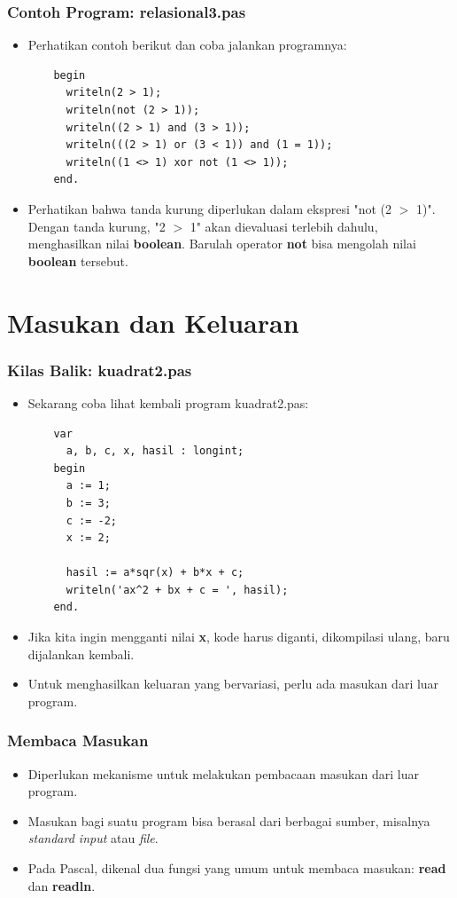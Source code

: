 \begin{frame}[fragile]
\frametitle{Contoh Program: relasional3.pas}
\begin{itemize}
  \item Perhatikan contoh berikut dan coba jalankan programnya:
  \begin{lstlisting}
    begin
      writeln(2 > 1);
      writeln(not (2 > 1));
      writeln((2 > 1) and (3 > 1));
      writeln(((2 > 1) or (3 < 1)) and (1 = 1));
      writeln((1 <> 1) xor not (1 <> 1));
    end.
  \end{lstlisting}
  \item Perhatikan bahwa tanda kurung diperlukan dalam ekspresi "not (2 $>$ 1)". Dengan tanda kurung, "2 $>$ 1" akan dievaluasi terlebih dahulu, menghasilkan nilai \textbf{boolean}. Barulah operator \textbf{not} bisa mengolah nilai \textbf{boolean} tersebut.
\end{itemize}
\end{frame}

\section{Masukan dan Keluaran}
\frame{\sectionpage}

\begin{frame}[fragile]
\frametitle{Kilas Balik: kuadrat2.pas}
\begin{itemize}
  \item Sekarang coba lihat kembali program kuadrat2.pas:
  \begin{lstlisting}
    var
      a, b, c, x, hasil : longint;
    begin
      a := 1;
      b := 3;
      c := -2;
      x := 2;

      hasil := a*sqr(x) + b*x + c;
      writeln('ax^2 + bx + c = ', hasil);
    end.
  \end{lstlisting}
  \item Jika kita ingin mengganti nilai \textbf{x}, kode harus diganti, dikompilasi ulang, baru dijalankan kembali.
  \item Untuk menghasilkan keluaran yang bervariasi, perlu ada \newline masukan dari luar program.
\end{itemize}
\end{frame}

\begin{frame}
\frametitle{Membaca Masukan}
\begin{itemize}
  \item Diperlukan mekanisme untuk melakukan pembacaan masukan dari luar program.
  \item Masukan bagi suatu program bisa berasal dari berbagai sumber, misalnya \textit{standard input} atau \textit{file}.
  \item Pada Pascal, dikenal dua fungsi yang umum untuk membaca masukan: \alert{\textbf{read}} dan \alert{\textbf{readln}}.
\end{itemize}
\end{frame}

